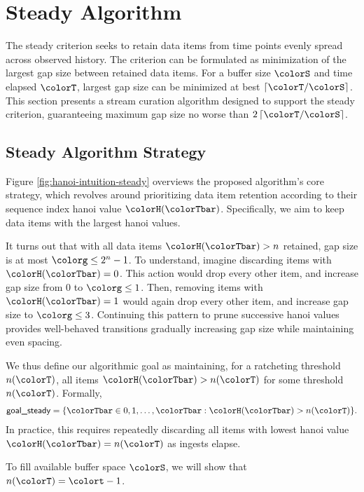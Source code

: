 \section{Steady Algorithm} \label{sec:steady}

The steady criterion seeks to retain data items from time points evenly spread across observed history.
The criterion can be formulated as minimization of the largest gap size between retained data items.
For a buffer size $\colorS$ and time elapsed $\colorT$, largest gap size can be minimized at best $\left\lceil \colorT / \colorS \right\rceil$.
This section presents a stream curation algorithm designed to support the steady criterion, guaranteeing maximum gap size no worse than $2\left\lceil \colorT / \colorS \right\rceil$.

\subsection{Steady Algorithm Strategy}
\label{sec:steady-strategy}

Figure \ref{fig:hanoi-intuition-steady} overviews the proposed algorithm's core strategy, which revolves around prioritizing data item retention according to their sequence index hanoi value $\colorH(\colorTbar)$.
Specifically, we aim to keep data items with the largest hanoi values.

It turns out that with all data items $\colorH(\colorTbar) > n$ retained, gap size is at most $\colorg \leq 2^n - 1$.
To understand, imagine discarding items with $\colorH(\colorTbar) = 0$.
This action would drop every other item, and increase gap size from 0 to $\colorg \leq 1$.
Then, removing items with $\colorH(\colorTbar) = 1$ would again drop every other item, and increase gap size to $\colorg \leq 3$.
Continuing this pattern to prune successive hanoi values provides well-behaved transitions gradually increasing gap size while maintaining even spacing.

We thus define our algorithmic goal as maintaining, for a ratcheting threshold $n(\colorT)$, all items $\colorH(\colorTbar) > n(\colorT)$ for some threshold $n(\colorT)$.
Formally,
\begin{align*}
\textsf{goal\_steady}
= \{
\colorTbar \in 0, 1, \ldots,\colorTbar
: \colorH(\colorTbar) > n(\colorT)
\}.
\end{align*}
In practice, this requires repeatedly discarding all items with lowest hanoi value $\colorH(\colorTbar) = n(\colorT)$ as ingests elapse.

To fill available buffer space $\colorS$, we will show that $n(\colorT) = \colort - 1$.

